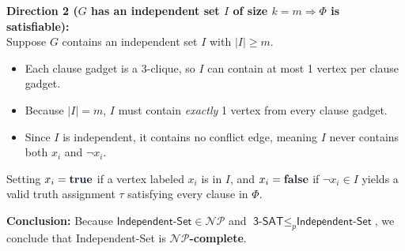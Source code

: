 \documentclass[11pt, a4paper]{article}
\newcommand{\kw}[1]{\textbf{\textcolor{primary}{#1}}}
\begin{document}
\begin{solutionbox}
  \vspace{2pt}

  \begin{proofbox}
    \textbf{Direction 2 ($G$ has an independent set $I$ of size $k=m \Rightarrow \Phi$ is satisfiable):} \\
    Suppose $G$ contains an independent set $I$ with $|I| \ge m$.
    \begin{itemize}[leftmargin=1.2em, itemsep=0.5pt]
      \item Each clause gadget is a 3-clique, so $I$ can contain at most 1 vertex per clause gadget.
      \item Because $|I| = m$, $I$ must contain \emph{exactly} 1 vertex from every clause gadget.
      \item Since $I$ is independent, it contains no conflict edge, meaning $I$ never contains both $x_i$ and $\neg x_i$.
    \end{itemize}
    Setting $x_i = \text{\kw{true}}$ if a vertex labeled $x_i$ is in $I$, and $x_i = \text{\kw{false}}$ if $\neg x_i \in I$ yields a valid truth assignment $\tau$ satisfying every clause in $\Phi$. \qedhere
  \end{proofbox}

  \begin{takeawaybox}
    \sffamily
    \textbf{Conclusion:} Because $\textsf{Independent-Set} \in \mathcal{NP}$ and $\textsf{3-SAT} \le_p \textsf{Independent-Set}$, we conclude that \textsf{Independent-Set} is \textbf{$\mathcal{NP}$-complete}.
  \end{takeawaybox}
\end{solutionbox}
\end{document}
